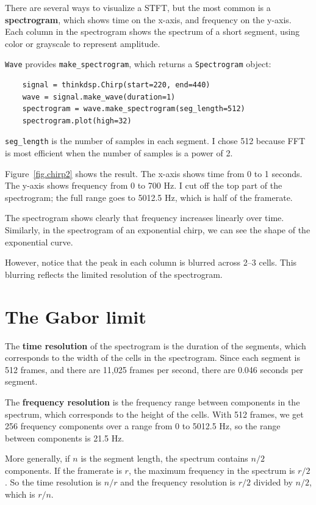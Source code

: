 \documentclass[12pt]{book}
\begin{document}
There are several ways to visualize a STFT, but the most common
is a {\bf spectrogram}, which shows time on the x-axis, and frequency
on the y-axis.  Each column in the spectrogram shows the spectrum of
a short segment, using color or grayscale to represent amplitude.

{\tt Wave} provides \verb"make_spectrogram", which returns a
{\tt Spectrogram} object:

\begin{verbatim}
    signal = thinkdsp.Chirp(start=220, end=440)
    wave = signal.make_wave(duration=1)
    spectrogram = wave.make_spectrogram(seg_length=512)
    spectrogram.plot(high=32)
\end{verbatim}

\verb"seg_length" is the number of samples in each segment.  I chose
512 because FFT is most efficient when the number of samples is a
power of 2.

Figure~\ref{fig.chirp2} shows the result.  The x-axis shows time from
0 to 1 seconds.  The y-axis shows frequency from 0 to 700 Hz.  I cut
off the top part of the spectrogram; the full range goes to 5012.5 Hz,
which is half of the framerate.

The spectrogram shows clearly that frequency increases linearly
over time.  Similarly, in the spectrogram of an exponential chirp, we
can see the shape of the exponential curve.

However, notice that the peak in each column is blurred across 2--3
cells.  This blurring reflects the limited resolution of the
spectrogram.


\section{The Gabor limit}

The {\bf time resolution} of the spectrogram is the duration of the
segments, which corresponds to the width of the cells in the
spectrogram.  Since each segment is 512 frames, and there are 11,025
frames per second, there are 0.046 seconds per segment.

The {\bf frequency resolution} is the frequency range between
components in the spectrum, which corresponds to the height of the
cells.  With 512 frames, we get 256 frequency components over a range
from 0 to 5012.5 Hz, so the range between components is 21.5 Hz.

More generally, if $n$ is the segment length, the spectrum contains
$n/2$ components.  If the framerate is $r$, the maximum frequency
in the spectrum is $r/2$.
So the time resolution is $n/r$ and the frequency resolution is 
$r/2$ divided by $n/2$, which is $r/n$.
\end{document}
